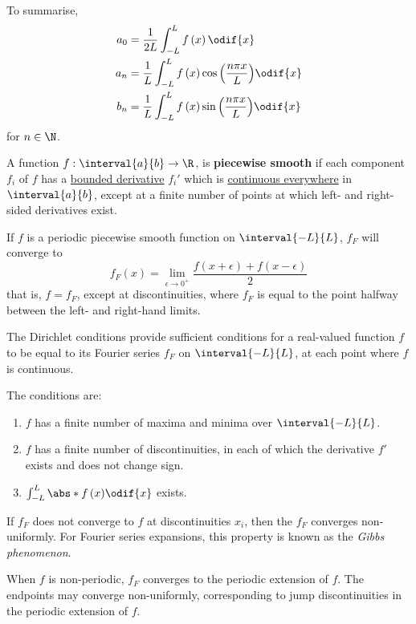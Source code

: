 \documentclass{article}
\begin{document}
To summarise,
\begin{align*}
    a_0 & = \frac{1}{2L} \int_{-L}^L f\left( x \right) \odif{x}                                       \\
    a_n & = \frac{1}{L} \int_{-L}^L f\left( x \right) \cos{\left( \frac{n \pi x}{L} \right)} \odif{x} \\
    b_n & = \frac{1}{L} \int_{-L}^L f\left( x \right) \sin{\left( \frac{n \pi x}{L} \right)} \odif{x}
\end{align*}
for \(n \in \N\).
\begin{definition}
    A function \(f : \interval{a}{b} \to \R\), is \textbf{piecewise smooth} if each component \(f_i\) of \(f\) has a \underline{bounded derivative} \(f_i'\) which is \underline{continuous everywhere} in \(\interval{a}{b}\), except at
    a finite number of points at which left- and right-sided derivatives exist.
\end{definition}
\begin{theorem}
    If \(f\) is a periodic piecewise smooth function on \(\interval{-L}{L}\), \(f_F\) will converge to
    \begin{equation*}
        f_F\left( x \right) = \lim_{\epsilon \to 0^{+}} \frac{f\left( x + \epsilon \right) + f\left( x - \epsilon \right)}{2}
    \end{equation*}
    that is, \(f = f_F\), except at discontinuities, where \(f_F\) is equal to the point halfway between the left- and right-hand limits.
\end{theorem}
\begin{corollary}
    The Dirichlet conditions provide sufficient conditions for a real-valued function \(f\) to be
    equal to its Fourier series \(f_F\) on \(\interval{-L}{L}\), at each point where \(f\) is continuous.

    The conditions are:
    \begin{enumerate}
        \item \(f\) has a finite number of maxima and minima over \(\interval{-L}{L}\).
        \item \(f\) has a finite number of discontinuities, in each of which the derivative \(f'\) exists and does not change sign.
        \item \(\int_{-L}^L \abs*{f\left( x \right)} \odif{x}\) exists.
    \end{enumerate}
\end{corollary}
\begin{definition}
    If \(f_F\) does not converge to \(f\) at discontinuities \(x_i\), then the \(f_F\) converges
    non-uniformly. For Fourier series expansions, this property is known as the \textit{Gibbs phenomenon}.
\end{definition}
\begin{note}
    When \(f\) is non-periodic, \(f_F\) converges to the periodic extension of \(f\).
    The endpoints may converge non-uniformly, corresponding to jump discontinuities in the periodic extension of \(f\).
\end{note}
\end{document}
